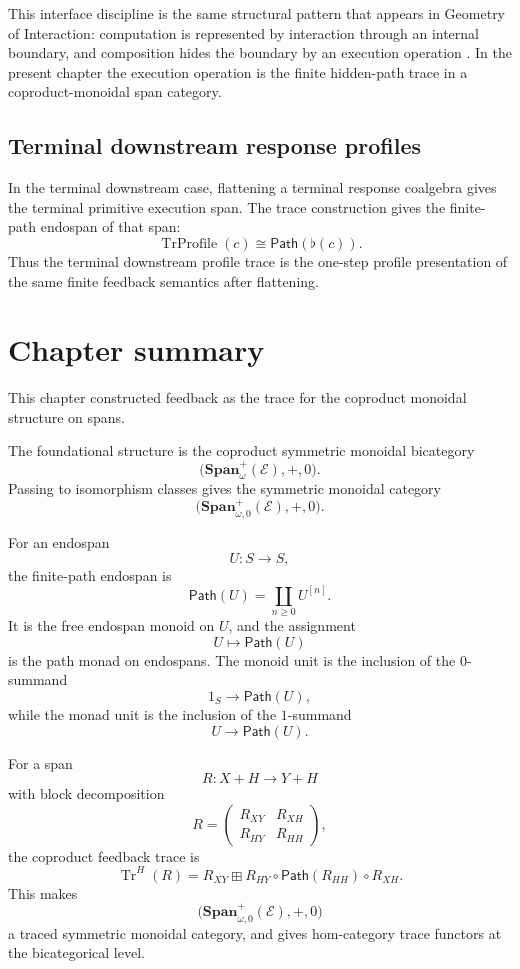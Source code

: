 This interface discipline is the same structural pattern that appears in
Geometry of Interaction: computation is represented by interaction through an
internal boundary, and composition hides the boundary by an execution
operation
\cite{Girard1989GeometryInteractionI,AbramskyHaghverdiScott2002GeometryInteractionLCA}.
In the present chapter the execution operation is the finite hidden-path trace
in a coproduct-monoidal span category.

\subsection{Terminal downstream response profiles}
\label{subsec:terminal-response-profiles-feedback}

In the terminal downstream case, flattening a terminal response coalgebra gives
the terminal primitive execution span. The trace construction gives the
finite-path endospan of that span:
\[
  \operatorname{TrProfile}(c)
  \cong
  \mathsf{Path}(\flat(c)).
\]
Thus the terminal downstream profile trace is the one-step profile
presentation of the same finite feedback semantics after flattening.

\section{Chapter summary}
\label{sec:feedback-trace-summary}

This chapter constructed feedback as the trace for the coproduct monoidal
structure on spans.

The foundational structure is the coproduct symmetric monoidal bicategory
\[
  \bigl(
    \mathbf{Span}^{+}_{\omega}(\mathcal E),+,0
  \bigr).
\]
Passing to isomorphism classes gives the symmetric monoidal category
\[
  \bigl(
    \mathbf{Span}^{+}_{\omega,0}(\mathcal E),+,0
  \bigr).
\]

For an endospan
\[
  U:S\to S,
\]
the finite-path endospan is
\[
  \mathsf{Path}(U)
  =
  \coprod_{n\geq 0}U^{[n]}.
\]
It is the free endospan monoid on \(U\), and the assignment
\[
  U\mapsto\mathsf{Path}(U)
\]
is the path monad on endospans. The monoid unit is the inclusion of the
\(0\)-summand
\[
  1_S\to\mathsf{Path}(U),
\]
while the monad unit is the inclusion of the \(1\)-summand
\[
  U\to\mathsf{Path}(U).
\]

For a span
\[
  R:X+H\to Y+H
\]
with block decomposition
\[
  R=
  \begin{pmatrix}
    R_{XY} & R_{XH}\\
    R_{HY} & R_{HH}
  \end{pmatrix},
\]
the coproduct feedback trace is
\[
  \operatorname{Tr}^{H}(R)
  =
  R_{XY}
  \boxplus
  R_{HY}\circ
  \mathsf{Path}(R_{HH})
  \circ
  R_{XH}.
\]
This makes
\[
  \bigl(
    \mathbf{Span}^{+}_{\omega,0}(\mathcal E),+,0
  \bigr)
\]
a traced symmetric monoidal category, and gives hom-category trace functors at
the bicategorical level.

